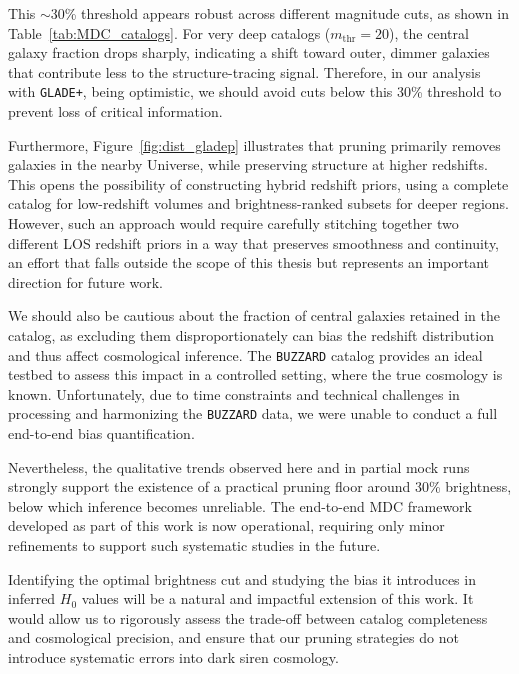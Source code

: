 This $\sim$30\% threshold appears robust across different magnitude cuts, as shown in Table~\ref{tab:MDC_catalogs}. For very deep catalogs ($m_{\mathrm{thr}} = 20$), the central galaxy fraction drops sharply, indicating a shift toward outer, dimmer galaxies that contribute less to the structure-tracing signal. Therefore, in our analysis with \texttt{GLADE+}, being optimistic, we should avoid cuts below this 30\% threshold to prevent loss of critical information.

Furthermore, Figure~\ref{fig:dist_gladep} illustrates that pruning primarily removes galaxies in the nearby Universe, while preserving structure at higher redshifts. This opens the possibility of constructing hybrid redshift priors, using a complete catalog for low-redshift volumes and brightness-ranked subsets for deeper regions. However, such an approach would require carefully stitching together two different \ac{LOS} redshift priors in a way that preserves smoothness and continuity, an effort that falls outside the scope of this thesis but represents an important direction for future work.

We should also be cautious about the fraction of central galaxies retained in the catalog, as excluding them disproportionately can bias the redshift distribution and thus affect cosmological inference. The \texttt{BUZZARD} catalog provides an ideal testbed to assess this impact in a controlled setting, where the true cosmology is known. Unfortunately, due to time constraints and technical challenges in processing and harmonizing the \texttt{BUZZARD} data, we were unable to conduct a full end-to-end bias quantification.

Nevertheless, the qualitative trends observed here and in partial mock runs strongly support the existence of a practical pruning floor around 30\% brightness, below which inference becomes unreliable. The end-to-end \ac{MDC} framework developed as part of this work is now operational, requiring only minor refinements to support such systematic studies in the future.

Identifying the optimal brightness cut and studying the bias it introduces in inferred $H_0$ values will be a natural and impactful extension of this work. It would allow us to rigorously assess the trade-off between catalog completeness and cosmological precision, and ensure that our pruning strategies do not introduce systematic errors into dark siren cosmology.